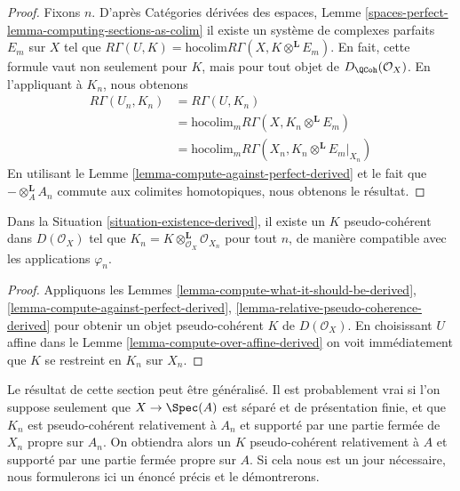 \begin{proof}
Fixons $n$. D'après Catégories dérivées des espaces, Lemme
\ref{spaces-perfect-lemma-computing-sections-as-colim}
il existe un système de complexes parfaits $E_m$
sur $X$ tel que
$R\Gamma(U, K) = \text{hocolim} R\Gamma(X, K \otimes^\mathbf{L} E_m)$.
En fait, cette formule vaut non seulement pour $K$, mais pour tout objet de
$D_\QCoh(\mathcal{O}_X)$.
En l'appliquant à $K_n$,
nous obtenons
\begin{align*}
R\Gamma(U_n, K_n)
& =
R\Gamma(U, K_n) \\
& =
\text{hocolim}_m R\Gamma(X, K_n \otimes^\mathbf{L} E_m) \\
& =
\text{hocolim}_m R\Gamma(X_n, K_n \otimes^\mathbf{L} E_m|_{X_n})
\end{align*}
En utilisant le Lemme \ref{lemma-compute-against-perfect-derived}
et le fait que $- \otimes_A^\mathbf{L} A_n$
commute aux colimites homotopiques, nous obtenons le résultat.
\end{proof}

\begin{theorem}
\label{theorem-existence-derived}
Dans la Situation \ref{situation-existence-derived},
il existe un $K$ pseudo-cohérent dans $D(\mathcal{O}_X)$
tel que $K_n = K \otimes_{\mathcal{O}_X}^\mathbf{L} \mathcal{O}_{X_n}$
pour tout $n$, de manière compatible avec les applications $\varphi_n$.
\end{theorem}

\begin{proof}
Appliquons les Lemmes \ref{lemma-compute-what-it-should-be-derived},
\ref{lemma-compute-against-perfect-derived},
\ref{lemma-relative-pseudo-coherence-derived}
pour obtenir un objet pseudo-cohérent $K$ de $D(\mathcal{O}_X)$.
En choisissant $U$ affine dans le Lemme
\ref{lemma-compute-over-affine-derived}
on voit immédiatement que $K$ se restreint en $K_n$ sur $X_n$.
\end{proof}

\begin{remark}
\label{remark-correct-generality}
Le résultat de cette section peut être généralisé. Il est probablement vrai
si l'on suppose seulement que $X \to \Spec(A)$ est séparé et de présentation finie,
et que $K_n$ est pseudo-cohérent relativement à $A_n$ et supporté par une partie
fermée de $X_n$ propre sur $A_n$. On obtiendra alors un $K$
pseudo-cohérent relativement à $A$ et supporté par une partie fermée
propre sur $A$. Si cela nous est un jour nécessaire, nous
formulerons ici un énoncé précis et le démontrerons.
\end{remark}

















